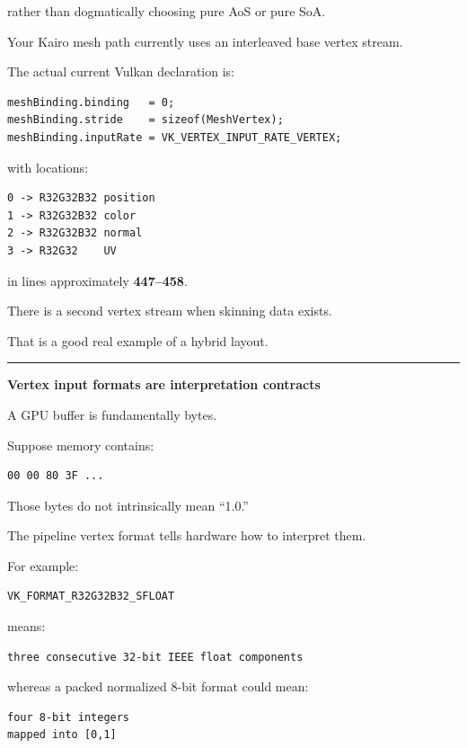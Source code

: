 rather than dogmatically choosing pure AoS or pure SoA.

Your Kairo mesh path currently uses an interleaved base vertex stream.

The actual current Vulkan declaration is:

\begin{verbatim}
meshBinding.binding   = 0;
meshBinding.stride    = sizeof(MeshVertex);
meshBinding.inputRate = VK_VERTEX_INPUT_RATE_VERTEX;
\end{verbatim}

with locations:

\begin{verbatim}
0 -> R32G32B32 position
1 -> R32G32B32 color
2 -> R32G32B32 normal
3 -> R32G32    UV
\end{verbatim}

in  lines approximately \textbf{447--458}.

There is a second vertex stream when skinning data exists.

That is a good real example of a hybrid layout.

\begin{center}\rule{0.5\linewidth}{0.5pt}\end{center}

\textbf{Vertex input formats are interpretation contracts}

A GPU buffer is fundamentally bytes.

Suppose memory contains:

\begin{verbatim}
00 00 80 3F ...
\end{verbatim}

Those bytes do not intrinsically mean ``1.0.''

The pipeline vertex format tells hardware how to interpret them.

For example:

\begin{verbatim}
VK_FORMAT_R32G32B32_SFLOAT
\end{verbatim}

means:

\begin{verbatim}
three consecutive 32-bit IEEE float components
\end{verbatim}

whereas a packed normalized 8-bit format could mean:

\begin{verbatim}
four 8-bit integers
mapped into [0,1]
\end{verbatim}


